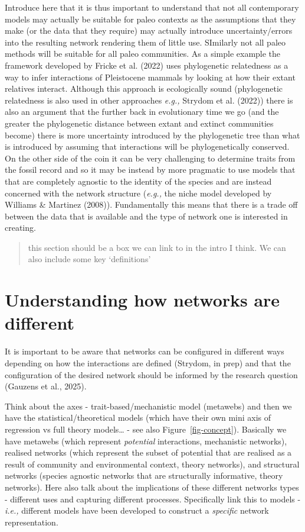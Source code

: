 \documentclass[
]{article}
\begin{document}
Introduce here that it is thus important to understand that not all
contemporary models may actually be suitable for paleo contexts as the
assumptions that they make (or the data that they require) may actually
introduce uncertainty/errors into the resulting network rendering them
of little use. SImilarly not all paleo methods will be suitable for all
paleo communities. As a simple example the framework developed by Fricke
et al. (2022) uses phylogenetic relatedness as a way to infer
interactions of Pleistocene mammals by looking at how their extant
relatives interact. Although this approach is ecologically sound
(phylogenetic relatedness is also used in other approaches \emph{e.g.,}
Strydom et al. (2022)) there is also an argument that the further back
in evolutionary time we go (and the greater the phylogenetic distance
between extant and extinct communities become) there is more uncertainty
introduced by the phylogenetic tree than what is introduced by assuming
that interactions will be phylogenetically conserved. On the other side
of the coin it can be very challenging to determine traits from the
fossil record and so it may be instead by more pragmatic to use models
that that are completely agnostic to the identity of the species and are
instead concerned with the network structure (\emph{e.g.,} the niche
model developed by Williams \& Martinez (2008)). Fundamentally this
means that there is a trade off between the data that is available and
the type of network one is interested in creating.

\begin{quote}
this section should be a box we can link to in the intro I think. We can
also include some key `definitions'
\end{quote}

\section{Understanding how networks are
different}\label{understanding-how-networks-are-different}

It is important to be aware that networks can be configured in different
ways depending on how the interactions are defined (Strydom, in prep)
and that the configuration of the desired network should be informed by
the research question (Gauzens et al., 2025).

Think about the axes - trait-based/mechanistic model (metawebs) and then
we have the statistical/theoretical models (which have their own mini
axis of regression vs full theory models\ldots{} - see also
Figure~\ref{fig-concept}). Basically we have metawebs (which represent
\emph{potential} interactions, mechanistic networks), realised networks
(which represent the subset of potential that are realised as a result
of community and environmental context, theory networks), and structural
networks (species agnostic networks that are structurally informative,
theory networks). Here also talk about the implications of these
different networks types - different uses and capturing different
processes. Specifically link this to models - \emph{i.e.,} different
models have been developed to construct a \emph{specific} network
representation.
\end{document}

